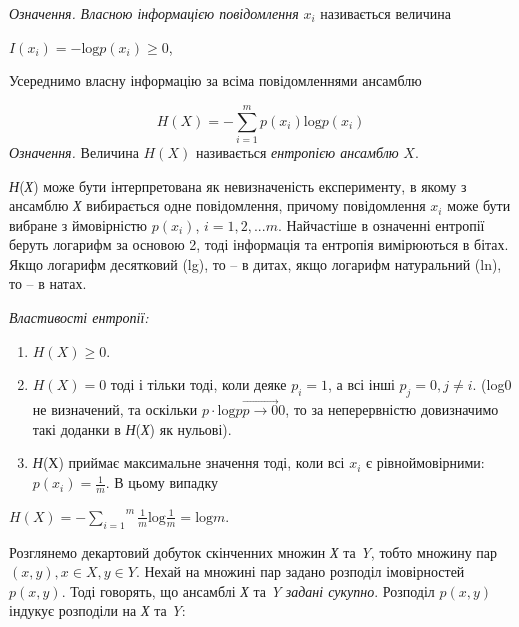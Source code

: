 \documentclass[a4paper]{article}
\newcommand\liststyleWWviiiNumxxxix{%
\renewcommand\theenumi{\arabic{enumi}}
\renewcommand\theenumii{\arabic{enumii}}
\renewcommand\theenumiii{\arabic{enumiii}}
\renewcommand\theenumiv{\arabic{enumiv}}
\renewcommand\labelenumi{\theenumi)}
\renewcommand\labelenumii{\theenumii.}
\renewcommand\labelenumiii{\theenumiii.}
\renewcommand\labelenumiv{\theenumiv.}
}
\newcounter{}
\begin{document}
\textit{Означення.} \textit{ Власною інформацією повідомлення}  ${x_{{i}}}$
називається величина

{\centering
 ${I(x_{{i}})=-\text{log}p(x_{{i}})\ge 0}$,
\par}

 Усереднимо власну інформацію за всіма повідомленнями ансамблю

\begin{equation*}
{H(X)=-\overset{{m}}{\underset{{i=1}}{\sum }}{p(x_{{i}})\text{log}p(x_{{i}})}}
\end{equation*}
\textit{Означення.} Величина  ${H(X)}$ називається \textit{ентропією ансамблю} 
${X}$.

\textit{Н}(\textit{Х}) може бути інтерпретована як невизначеність експерименту,
в  якому  з ансамблю \textit{Х }вибирається одне повідомлення, причому
повідомлення   ${x_{{i}}}$ може бути вибране з ймовірністю ${p(x_{{i}})}$,
${i=1,2,\text{.}\text{.}\text{.}m\text{.}}$ Найчастіше в означенні ентропії
беруть логарифм за основою 2, тоді інформація та ентропія вимірюються в бітах.
Якщо логарифм десятковий (lg), то – в дитах, якщо логарифм натуральний (ln), то
– в натах.


\bigskip

{\itshape
Властивості ентропії:}

\liststyleWWviiiNumxxxix
\begin{enumerate}
\item  ${H(X)\ge 0}$.
\item  ${H(X)=0}$ тоді і тільки тоді, коли деяке  ${p_{{i}}=1}$, а всі інші 
${p_{{j}}=0,j\neq i}$. (log0 не визначений, та оскільки  ${p\cdot
\text{log}p\overrightarrow{{{p\rightarrow 0}}}0}$, то за неперервністю
довизначимо такі доданки в \textit{Н}(\textit{Х}) як нульові).
\item \textit{Н}(Х) приймає максимальне значення тоді, коли всі  ${x_{{i}}}$ є
рівноймовірними:  ${p(x_{{i}})=\frac{1}{m}}$. В цьому випадку
\end{enumerate}
{\centering
 ${H(X)=-\overset{{m}}{\underset{{i=1}}{\sum
}}{\frac{{1}}{{m}}\text{log}\frac{1}{m}}=\text{log}m}$.
\par}


\bigskip

Розглянемо декартовий добуток скінченних множин \textit{Х} та \textit{Y}, тобто
множину пар  ${(x,y),x\in X,y\in Y}$. Нехай на множині пар задано розподіл
імовірностей  ${p(x,y)}$. Тоді говорять, що ансамблі \textit{Х} та \textit{Y}
\textit{задані сукупно}. Розподіл  ${p(x,y)}$ індукує розподіли на \textit{Х}
та \textit{Y}:
\end{document}
